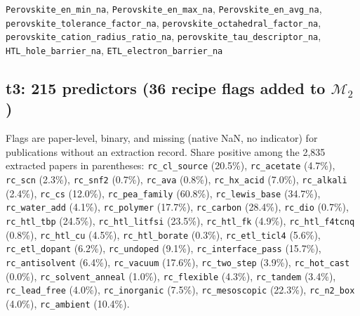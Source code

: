 \documentclass[10pt]{article}
\begin{document}
\texttt{Perovskite\_en\_min\_na}, \texttt{Perovskite\_en\_max\_na}, \texttt{Perovskite\_en\_avg\_na}, \texttt{perovskite\_tolerance\_factor\_na}, \texttt{perovskite\_octahedral\_factor\_na}, \texttt{perovskite\_cation\_radius\_ratio\_na}, \texttt{perovskite\_tau\_descriptor\_na}, \texttt{HTL\_hole\_barrier\_na}, \texttt{ETL\_electron\_barrier\_na}\par\smallskip
\subsection*{t3: 215 predictors (36 recipe flags added to $\mathcal{M}_2$)}
Flags are paper-level, binary, and missing (native NaN, no indicator) for publications without an extraction record. Share positive among the 2,835 extracted papers in parentheses: \texttt{rc\_cl\_source} (20.5\%), \texttt{rc\_acetate} (4.7\%), \texttt{rc\_scn} (2.3\%), \texttt{rc\_snf2} (0.7\%), \texttt{rc\_ava} (0.8\%), \texttt{rc\_hx\_acid} (7.0\%), \texttt{rc\_alkali} (2.4\%), \texttt{rc\_cs} (12.0\%), \texttt{rc\_pea\_family} (60.8\%), \texttt{rc\_lewis\_base} (34.7\%), \texttt{rc\_water\_add} (4.1\%), \texttt{rc\_polymer} (17.7\%), \texttt{rc\_carbon} (28.4\%), \texttt{rc\_dio} (0.7\%), \texttt{rc\_htl\_tbp} (24.5\%), \texttt{rc\_htl\_litfsi} (23.5\%), \texttt{rc\_htl\_fk} (4.9\%), \texttt{rc\_htl\_f4tcnq} (0.8\%), \texttt{rc\_htl\_cu} (4.5\%), \texttt{rc\_htl\_borate} (0.3\%), \texttt{rc\_etl\_ticl4} (5.6\%), \texttt{rc\_etl\_dopant} (6.2\%), \texttt{rc\_undoped} (9.1\%), \texttt{rc\_interface\_pass} (15.7\%), \texttt{rc\_antisolvent} (6.4\%), \texttt{rc\_vacuum} (17.6\%), \texttt{rc\_two\_step} (3.9\%), \texttt{rc\_hot\_cast} (0.0\%), \texttt{rc\_solvent\_anneal} (1.0\%), \texttt{rc\_flexible} (4.3\%), \texttt{rc\_tandem} (3.4\%), \texttt{rc\_lead\_free} (4.0\%), \texttt{rc\_inorganic} (7.5\%), \texttt{rc\_mesoscopic} (22.3\%), \texttt{rc\_n2\_box} (4.0\%), \texttt{rc\_ambient} (10.4\%).\par\smallskip
\end{document}
